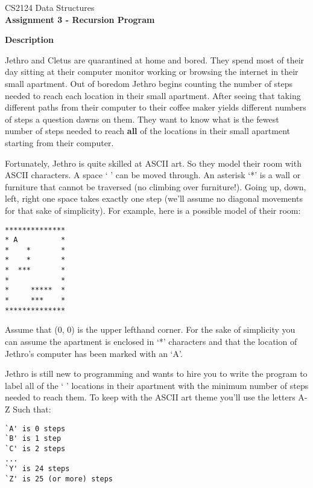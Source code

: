 \documentclass[12pt]{elsart}
\begin{document}
\pagestyle{empty}

\begin{center}
\Large  CS2124 Data Structures \\
\large {\bf Assignment 3 - Recursion Program}\\
\end{center}

{\bf Description} 

Jethro and Cletus are quarantined at home and bored. They spend most of their day sitting at their computer monitor working or browsing the internet in their small apartment. Out of boredom Jethro begins counting the number of steps needed to reach each location in their small apartment. After seeing that taking different paths from their computer to their coffee maker yields different numbers of steps a question dawns on them. They want to know what is the fewest number of steps needed to reach {\bf all} of the locations in their small apartment starting from their computer.  

Fortunately, Jethro is quite skilled at ASCII art. So they model their room with ASCII characters. A space ` ' can be moved through. An asterisk `*' is a wall or furniture that cannot be traversed (no climbing over furniture!).  Going up, down, left, right one space takes exactly one step (we'll assume no diagonal movements for that sake of simplicity). For example, here is a possible model of their room:

{\small
\begin{verbatim}
**************
* A          *
*    *       *
*    *       *
*  ***       *
*            *
*     *****  *
*     ***    *
**************
\end{verbatim}
}

Assume that (0, 0) is the upper lefthand corner.  For the sake of simplicity you can assume the apartment is enclosed in `*' characters and that the location of Jethro's computer has been marked with an `A'.

Jethro is still new to programming and wants to hire you to write the program to label all of the ` ' locations in their apartment with the minimum number of steps needed to reach them.  To keep with the ASCII art theme you'll use the letters A-Z Such that:

{\small
\begin{verbatim}
`A' is 0 steps 
`B' is 1 step 
`C' is 2 steps
...
`Y' is 24 steps
`Z' is 25 (or more) steps
\end{verbatim}
}
\end{document}
